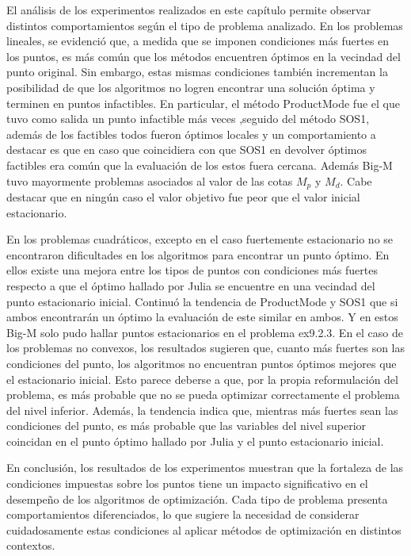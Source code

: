 El análisis de los experimentos realizados en este capítulo permite observar distintos comportamientos según el tipo de problema analizado.
En los problemas lineales, se evidenció que, a medida que se imponen condiciones más fuertes en los puntos, es más común que los métodos encuentren óptimos en la vecindad del punto original. 
Sin embargo, estas mismas condiciones también incrementan la posibilidad de que los algoritmos no logren encontrar una solución óptima y terminen en puntos infactibles. 
En particular, el método ProductMode fue el que  tuvo como salida un punto infactible más veces ,seguido del método SOS1, además de los factibles todos fueron óptimos locales y un comportamiento a destacar es que en caso que coincidiera con que SOS1 en devolver óptimos factibles era común que la evaluación de los estos fuera cercana.
Además Big-M tuvo mayormente problemas asociados al valor de las cotas $M_p$ y $M_d$. 
Cabe destacar que en ningún caso el valor objetivo fue peor que el valor inicial estacionario. 

En los problemas cuadráticos, excepto en el caso fuertemente estacionario no se encontraron dificultades en los algoritmos para encontrar un punto óptimo. En ellos existe una mejora entre los tipos de puntos con condiciones más fuertes respecto a que el óptimo hallado por Julia se encuentre en una vecindad del punto estacionario inicial. 
Continuó la tendencia de ProductMode y SOS1 que si ambos encontrarán un óptimo la evaluación de este similar en ambos. 
Y en estos Big-M solo pudo hallar puntos estacionarios en el problema ex9.2.3.
En el caso de los problemas no convexos, los resultados sugieren que, cuanto más fuertes son las condiciones del punto, los algoritmos no encuentran puntos óptimos mejores que el estacionario inicial. Esto parece deberse a que, por la propia reformulación del problema, es más probable que no se pueda optimizar correctamente el problema del nivel inferior. Además, la tendencia indica que, mientras más fuertes sean las condiciones del punto, es más probable que las variables del nivel superior coincidan en el punto óptimo hallado por Julia y el punto estacionario inicial.

En conclusión, los resultados de los experimentos muestran que la fortaleza de las condiciones impuestas 
sobre los puntos tiene un impacto significativo en el desempeño de los algoritmos de optimización. 
Cada tipo de problema presenta comportamientos diferenciados, lo que sugiere la necesidad de considerar 
cuidadosamente estas condiciones al aplicar métodos de optimización en distintos contextos.
